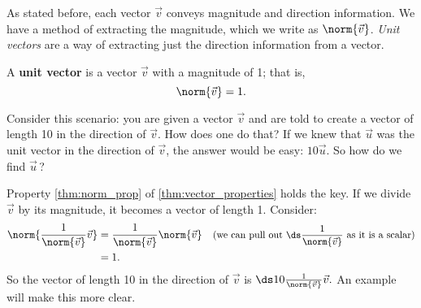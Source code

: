 As stated before, each vector $\vec v$ conveys magnitude and direction information. We have a method of extracting the magnitude, which we write as $\norm{\vec v}$. \emph{Unit vectors} are a way of extracting just the direction information from a vector.

\begin{definition}\label{def:unit_vector}
A \textbf{unit vector} is a vector $\vec v$ with a magnitude of 1; that is, 
\[\norm{\vec v}=1.\]
\end{definition}

Consider this scenario: you are given a vector $\vec v$ and are told to create a vector of length 10 in the direction of $\vec v$. How does one do that? If we knew that $\vec u$ was the unit vector in the direction of $\vec v$, the answer would be easy: $10\vec u$. So how do we find $\vec u$\,?


Property \ref{thm:norm_prop} of \autoref{thm:vector_properties} holds the key. If we divide $\vec v$ by its magnitude, it becomes a vector of length 1. Consider:
\begin{align*}
	\norm{\frac{1}{\norm{\vec v}}\vec v}
	&= \frac{1}{\norm{\vec v}}\norm{\vec v}
	& \text{\small (we can pull out $\ds \frac{1}{\norm{\vec v}}$ as it is a scalar)}\\
	&= 1.
\end{align*}			
So the vector of length 10 in the direction of $\vec v$ is $\ds 10\frac{1}{\norm{\vec v}}\vec v.$ An example will make this more clear.

